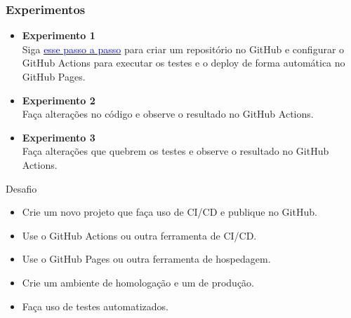 \documentclass[
	9pt, %
	t, %
]{beamer}
\begin{document}
\begin{frame}
	\frametitle{Experimentos}
	\begin{itemize}
		\item \textbf{Experimento 1}\\ Siga \href{https://github.com/fabricioifc/ci-cd-example/blob/main/README.md}{\textcolor{blue}{esse passo a passo}} para criar um repositório no GitHub e configurar o GitHub Actions para executar os testes e o deploy de forma automática no GitHub Pages.
		\item \textbf{Experimento 2}\\ Faça alterações no código e observe o resultado no GitHub Actions.
		\item \textbf{Experimento 3}\\ Faça alterações que quebrem os testes e observe o resultado no GitHub Actions.
	\end{itemize}

	\begin{block}{Desafio}
		\begin{itemize}
			\item Crie um novo projeto que faça uso de CI/CD e publique no GitHub.
			\item Use o GitHub Actions ou outra ferramenta de CI/CD.
			\item Use o GitHub Pages ou outra ferramenta de hospedagem.
			\item Crie um ambiente de homologação e um de produção. 
			\item Faça uso de testes automatizados.
		\end{itemize}

	\end{block}

\end{frame}
\end{document}
